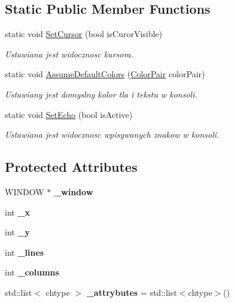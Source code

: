 \subsection*{Static Public Member Functions}
\begin{DoxyCompactItemize}
\item 
static void \hyperlink{class_window_aa236ccfebd21bb8283f530cb5b7fab89}{Set\+Cursor} (bool is\+Curor\+Visible)
\begin{DoxyCompactList}\small\item\em Ustawiana jest widocznosc kursora. \end{DoxyCompactList}\item 
static void \hyperlink{class_window_a7b1725e57ac5d7b5a90661fa0bad373e}{Assume\+Default\+Colors} (\hyperlink{class_color_pair}{Color\+Pair} color\+Pair)
\begin{DoxyCompactList}\small\item\em Ustawiany jest domyslny kolor tla i tekstu w konsoli. \end{DoxyCompactList}\item 
static void \hyperlink{class_window_ad89f757546282b04fc640146750aff22}{Set\+Echo} (bool is\+Active)
\begin{DoxyCompactList}\small\item\em Ustawiana jest widocznosc wpisywanych znakow w konsoli. \end{DoxyCompactList}\end{DoxyCompactItemize}
\subsection*{Protected Attributes}
\begin{DoxyCompactItemize}
\item 
\hypertarget{class_window_a6b8554b20546907c275c7ad61a529aa2}{}W\+I\+N\+D\+O\+W $\ast$ {\bfseries \+\_\+window}\label{class_window_a6b8554b20546907c275c7ad61a529aa2}

\item 
\hypertarget{class_window_af907a6d65dbddffb8e58e162e22472e3}{}int {\bfseries \+\_\+x}\label{class_window_af907a6d65dbddffb8e58e162e22472e3}

\item 
\hypertarget{class_window_a40112a204e3a41a989ab7d4d55107390}{}int {\bfseries \+\_\+y}\label{class_window_a40112a204e3a41a989ab7d4d55107390}

\item 
\hypertarget{class_window_a7a08a07989f3c7f061a01a279c1f7de1}{}int {\bfseries \+\_\+lines}\label{class_window_a7a08a07989f3c7f061a01a279c1f7de1}

\item 
\hypertarget{class_window_a1b6d1a10dbdf2d136428bca807d074a2}{}int {\bfseries \+\_\+columns}\label{class_window_a1b6d1a10dbdf2d136428bca807d074a2}

\item 
\hypertarget{class_window_ac233c371c76b0b5cf81ab30de683c79a}{}std\+::list$<$ chtype $>$ {\bfseries \+\_\+attrybutes} = std\+::list$<$chtype$>$()\label{class_window_ac233c371c76b0b5cf81ab30de683c79a}

\end{DoxyCompactItemize}

